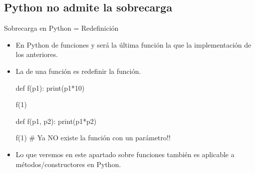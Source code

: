 \documentclass[10pt,envcountsect,spanish]{beamer}
\begin{document}
\subsection{Python no admite la sobrecarga}


\begin{frame}[fragile]{Sobrecarga en Python = Redefinición} 

\begin{itemize}
\item En Python  de funciones y será la última función la que  la implementación de los anteriores. 

\item La  de una función es redefinir la función.

\begin{pyconsole}[][frame=single]
def f(p1):
    print(p1*10)
    
f(1)

def f(p1, p2):
    print(p1*p2)

f(1) #  Ya NO existe la función con un parámetro!!
\end{pyconsole}

\item Lo que veremos en este apartado sobre funciones también es aplicable a métodos/constructores en Python.

\end{itemize}

\end{frame}
\end{document}
